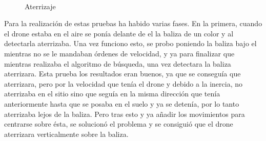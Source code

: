 \begin{figure}[H]
 \centering
	\\
 \caption{Aterrizaje}
 \label{f:Aterrizaje sobre el simulador}
\end{figure}


\hspace{1cm} Para la realizaci\'on de estas pruebas ha habido varias fases. En la primera, cuando el drone estaba en el aire se pon\'ia delante de el la baliza de un color y al detectarla aterrizaba. Una vez funciono esto, se probo poniendo la baliza bajo el mientras no se le mandaban \'ordenes de velocidad, y ya para finalizar que mientras realizaba el algoritmo de b\'usqueda, una vez detectara la baliza aterrizara. Esta prueba los resultados eran buenos, ya que se consegu\'ia que aterrizara, pero por la velocidad que ten\'ia el drone y debido a la inercia, no aterrizaba en el sitio sino que segu\'ia en la misma direcci\'on que ten\'ia anteriormente hasta que se posaba en el suelo y ya se deten\'ia, por lo tanto aterrizaba lejos de la baliza. Pero tras esto y ya añadir los movimientos para centrarse sobre \'esta, se solucion\'o el problema y se consigui\'o que el drone aterrizara verticalmente sobre la baliza. 

